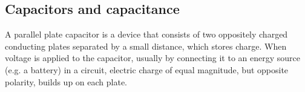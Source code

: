 
\subsection{Capacitors and capacitance}

A parallel plate capacitor is a device that consists of two
oppositely charged conducting plates separated by a small
distance, which stores charge. When voltage is applied to the
capacitor, usually by connecting it to an energy source (e.g. a battery) in a circuit, electric charge of equal magnitude, but opposite
polarity, builds up on each plate.\\

